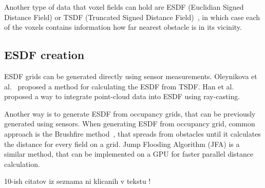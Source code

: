 \documentclass[letterpaper, 10 pt, conference]{ieeeconf}  %
\begin{document}
Another type of data that voxel fields can hold are ESDF (Euclidian Signed Distance Field) or TSDF (Truncated Signed Distance Field)~\cite{oleynikova2017voxblox}, in which case each of the voxels contains information how far nearest obstacle is in its vicinity.

\subsection{ESDF creation}

ESDF grids can be generated directly using sensor measurements. Oleynikova et al.~\cite{oleynikova2017voxblox} proposed a method for calculating the ESDF from TSDF. Han et al.~\cite{han2019fiesta} proposed a way to integrate point-cloud data into ESDF using ray-casting.  

Another way is to generate ESDF from occupancy grids, that can be previously generated using sensors. When generating ESDF from occupancy grid, common approach is the Brushfire method~\cite{lau2010improved}, that spreads from obstacles until it calculates the distance for every field on a grid. Jump Flooding Algorithm (JFA) is a similar method, that can be implemented on a GPU for faster parallel distance calculation.  

 
 \alert{10-ish citatov iz seznama ni klicanih v tekstu !}

\clearpage


\addtolength{\textheight}{-12cm}   %
\end{document}
